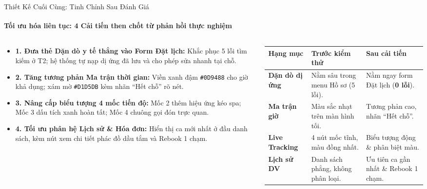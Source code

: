 \begin{frame}{Thiết Kế Cuối Cùng: Tinh Chỉnh Sau Đánh Giá}
  \framesubtitle{\color{PetcareSecondary}\textbf{Tối ưu hóa liên tục: 4 Cải tiến then chốt từ phản hồi thực nghiệm}}

  \begin{columns}[T]
    \begin{column}{0.54\textwidth}
      \begin{itemize}
        \setlength\itemsep{1.5mm}
        \footnotesize
        \item \textbf{1. Đưa thẻ Dặn dò y tế thẳng vào Form Đặt lịch:} Khắc phục 5 lỗi tìm kiếm ở T2; hệ thống tự nạp dị ứng đã lưu và cho phép sửa nhanh tại chỗ.
        \item \textbf{2. Tăng tương phản Ma trận thời gian:} Viền xanh đậm \texttt{\#0D9488} cho giờ khả dụng; xám mờ \texttt{\#D1D5DB} kèm nhãn ``Hết chỗ'' rõ nét.
        \item \textbf{3. Nâng cấp biểu tượng 4 mốc tiến độ:} Mốc 2 thêm hiệu ứng kéo spa; Mốc 3 dấu tích xanh hoàn tất; Mốc 4 chuông gọi đón trực quan.
        \item \textbf{4. Tối ưu phân hệ Lịch sử \& Hóa đơn:} Hiển thị ca mới nhất ở đầu danh sách, kèm nút xem chi tiết phác đồ dầu tắm và Rebook 1 chạm.
      \end{itemize}
    \end{column}

    \begin{column}{0.44\textwidth}
      \begin{table}
        \centering
        \tiny
        \renewcommand{\arraystretch}{1.2}
        \begin{tabularx}{\textwidth}{|l|X|X|}
          \hline
          \rowcolor{PetcarePrimary!15}
          \textbf{Hạng mục} & \textbf{Trước kiểm thử} & \textbf{Sau cải tiến} \\ \hline
          \textbf{Dặn dò dị ứng} & Nằm sâu trong menu Hồ sơ (5 lỗi). & Nằm ngay form Đặt lịch (\textbf{0 lỗi}). \\ \hline
          \textbf{Ma trận giờ} & Màu sắc nhạt trên màn hình tối. & Tương phản cao, nhãn ``Hết chỗ''. \\ \hline
          \textbf{Live Tracking} & 4 nút mốc tĩnh, màu đồng nhất. & Biểu tượng động \& phân biệt màu. \\ \hline
          \textbf{Lịch sử DV} & Danh sách phẳng, không phân loại. & Ưu tiên ca gần nhất \& Rebook 1 chạm. \\ \hline
        \end{tabularx}
      \end{table}


\end{column}
\end{columns}
\end{frame}

